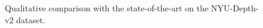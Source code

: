 \documentclass{vip-theme}
\begin{document}
\begin{figure}[!htbp]
        \caption{Qualitative comparison with the state-of-the-art on the NYU-Depth-v2 dataset.}
        \label{fig:qualitative-comparison}
\end{figure}



%
\end{document}
